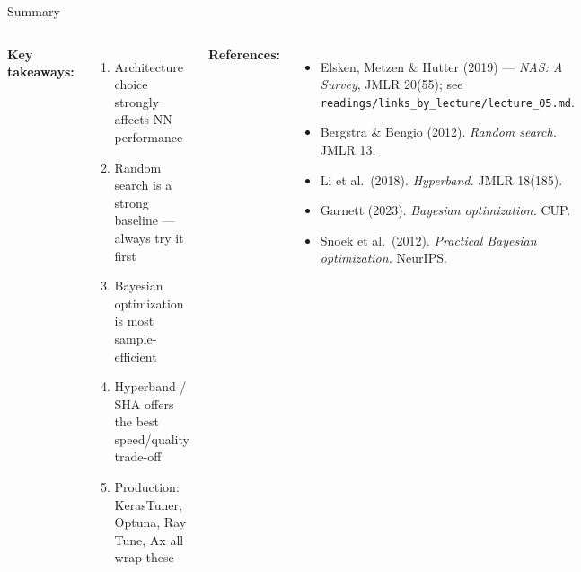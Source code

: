 \documentclass[aspectratio=169,11pt]{beamer}
\newcommand{\emphc}[1]{\textcolor{harvardcrimson}{#1}}
\begin{document}
\begin{frame}{Summary}
\begin{columns}[T]
\textbf{Key takeaways:}
\begin{enumerate}
    \item Architecture choice \emphc{strongly} affects NN performance
    \item Random search is a strong baseline --- always try it first
    \item Bayesian optimization is most sample-efficient
    \item Hyperband / SHA offers the best speed/quality trade-off
    \item Production: KerasTuner, Optuna, Ray Tune, Ax all wrap these
\end{enumerate}

\textbf{References:}
{\scriptsize
\begin{itemize}\itemsep0pt
    \item \emphc{Elsken, Metzen \& Hutter (2019)} --- \emph{NAS: A Survey}, JMLR 20(55); see \texttt{readings/links\_by\_lecture/lecture\_05.md}.
    \item Bergstra \& Bengio (2012). \emph{Random search.} JMLR 13.
    \item Li et al.\ (2018). \emph{Hyperband.} JMLR 18(185).
    \item Garnett (2023). \emph{Bayesian optimization.} CUP.
    \item Snoek et al.\ (2012). \emph{Practical Bayesian optimization.} NeurIPS.
\end{itemize}
}
\end{columns}

\end{frame}
\end{document}
